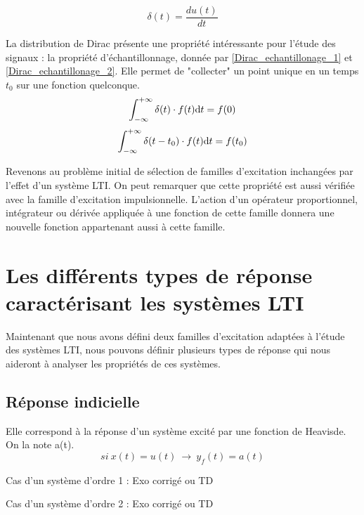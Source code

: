 \documentclass[]{book}
\begin{document}
{	
	\begin{equation}\label{Dirac}
	\delta (t) = \frac{du(t)}{dt}	 	
	\end{equation}
	
	La distribution de Dirac présente une propriété intéressante pour l'étude des signaux : la propriété d'échantillonnage, donnée par \ref{Dirac_echantillonage_1} et \ref{Dirac_echantillonage_2}. Elle permet de "collecter" un point unique en un temps  $t_{0}$ sur une fonction quelconque.
	\begin{equation}\label{Dirac_echantillonage_1}
	\int_{-\infty}^{+\infty} \delta (t) \cdot f(t) \mathrm{d} t = f(0) 	 
	\end{equation}
	\begin{equation}\label{Dirac_echantillonage_2} 	
	\int_{-\infty}^{+\infty} \delta (t-t_{0}) \cdot f(t) \mathrm{d} t = f(t_{0}) 
	\end{equation}
	
	\vspace{0.5\baselineskip}
	Revenons au problème initial de sélection de familles d'excitation inchangées par l'effet d'un système LTI. On peut remarquer que cette propriété est aussi vérifiée avec la famille d'excitation impulsionnelle. L'action d'un opérateur proportionnel, intégrateur ou dérivée appliquée à une fonction de cette famille donnera une nouvelle fonction appartenant aussi à cette famille.
	
	
	\section{Les différents types de réponse caractérisant les systèmes LTI}
	Maintenant que nous avons défini deux familles d'excitation adaptées à l'étude des systèmes LTI, nous pouvons définir plusieurs types de réponse qui nous aideront à analyser les propriétés de ces systèmes.
	\subsection{Réponse indicielle}
	Elle correspond à la réponse d'un système excité par une fonction de Heavisde. On la note a(t).
	\begin{equation}\label{key}
	si~x(t)=u(t)~\rightarrow ~y_{f}(t)=a(t)
	\end{equation}
	
	
	Cas d'un système d'ordre 1 : Exo corrigé ou TD
	
	Cas d'un système d'ordre 2 : Exo corrigé ou TD
	
	
}
\end{document}
